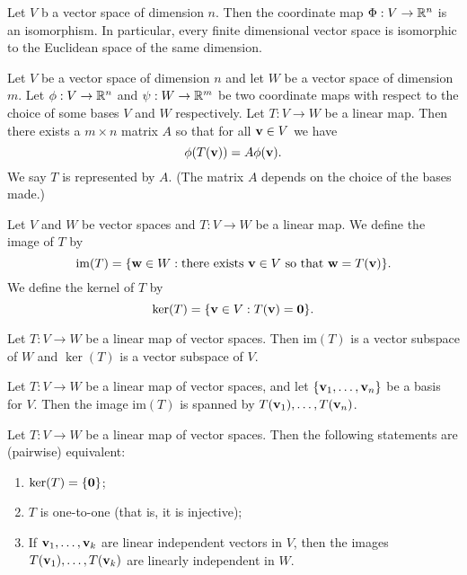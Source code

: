 \documentclass[10pt, a4paper]{article}
\begin{document}
\begin{lemma}
    Let $V$ b a vector space of dimension $n$.
    Then the coordinate map $\Phi : V \rightarrow \mathbb{R} ^ n$ is an isomorphism.
    In particular,
    every finite dimensional vector space is isomorphic to the Euclidean space of the same dimension.
\end{lemma}

\begin{theorem}
    Let $V$ be a vector space of dimension $n$ and let $W$ be a vector space of dimension $m$.
    Let $\phi : V \rightarrow \mathbb{R} ^ n$ and $\psi : W \rightarrow \mathbb{R} ^ m$ be two coordinate maps with respect to the choice of some bases $V$ and $W$ respectively.
    Let $T : V \rightarrow W$ be a linear map.
    Then there exists a $m \times n$ matrix $A$ so that for all $\mathbf{v} \in V$ we have
    \[
    \phi(T(\mathbf{v})) = A\phi(\mathbf{v}).
    \]
    We say $T$ is represented by $A$.
    (The matrix $A$ depends on the choice of the bases made.)
\end{theorem}

\begin{definition}
    Let $V$ and $W$ be vector spaces and $T : V \rightarrow W$ be a linear map.
    We define the image of $T$ by
    \[
    \mathrm{im}(T) = \{\mathbf{w} \in W : \text{there exists $\mathbf{v} \in V$ so that } \mathbf{w} = T(\mathbf{v})\}.
    \]
    We define the kernel of $T$ by
    \[
    \ker(T) = \{\mathbf{v} \in V : T(\mathbf{v}) = \mathbf{0}\}.
    \]
\end{definition}

\begin{lemma}
    Let $T : V \rightarrow W$ be a linear map of vector spaces.
    Then $\mathrm{im}(T)$ is a vector subspace of $W$ and $\ker(T)$ is a vector subspace of $V$.
\end{lemma}

\begin{lemma}
    Let $T : V \rightarrow W$ be a linear map of vector spaces,
    and let $\{\mathbf{v}_1, \dotsc, \mathbf{v}_n\}$ be a basis for $V$.
    Then the image $\mathrm{im}(T)$ is spanned by $T(\mathbf{v}_1), \dotsc, T(\mathbf{v}_n)$.
\end{lemma}

\begin{proposition}
    Let $T : V \rightarrow W$ be a linear map of vector spaces.
    Then the following statements are
    (pairwise)
    equivalent:
    \begin{enumerate}[label = (\roman*)]
        \item $\ker(T) = \{\mathbf{0}\}$;
        \item $T$ is one-to-one
        (that is,
        it is injective);
        \item If $\mathbf{v}_1, \dotsc, \mathbf{v}_k$ are linear independent vectors in $V$,
        then the images $T(\mathbf{v}_1), \dotsc, T(\mathbf{v}_k)$ are linearly independent in $W$.
    \end{enumerate}
\end{proposition}
\end{document}

